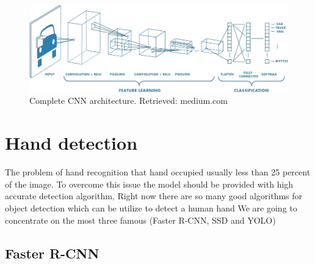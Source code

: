 \documentclass[12pt]{report}
\begin{document}
            \begin{figure} [h]
                \centering
                \includegraphics[width=\textwidth]{./images/c_cnn.jpeg}

                \caption{Complete CNN architecture. Retrieved: medium.com}
                \label{fig:c_cnn}
            \end{figure}


\section{Hand detection}

The problem of hand recognition that hand occupied usually less than 25 percent of the image.
To overcome this issue the model should be provided with high accurate detection algorithm,
Right now there are so many good algorithms for object detection which can be utilize to 
detect a human hand We are going to concentrate on the most three famous (Faster R-CNN, SSD and YOLO)

\subsection{Faster R-CNN}
\end{document}
